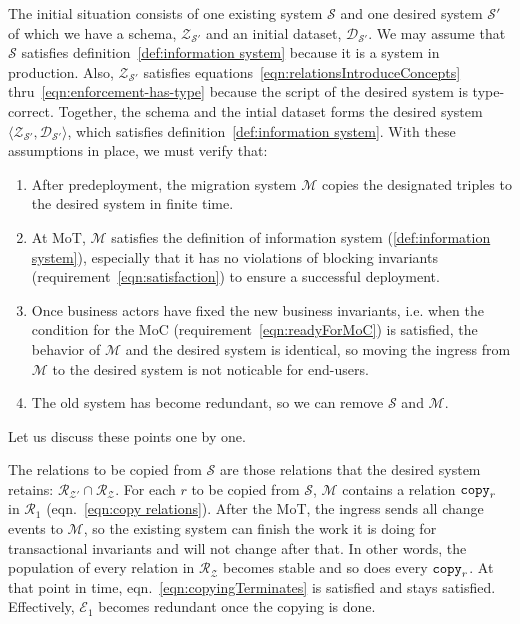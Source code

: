 \documentclass[runningheads]{llncs}
\newcommand{\pair}[2]{\langle{#1},{#2}\rangle}
\newcommand{\rels}{\mathcal{R}}   %
\newcommand{\transactions}{\mathcal{E}}
\newcommand{\dataset}{\mathscr{D}}
\newcommand{\schema}{\mathscr{Z}}
\newcommand{\migrsys}{\mathscr{M}}
\newcommand{\infsys}{\mathscr{S}}
\begin{document}
   The initial situation consists of one existing system $\infsys$ and one desired system $\infsys'$ of which we have a schema, $\schema_{\infsys'}$ and an initial dataset, $\dataset_{\infsys'}$.
   We may assume that $\infsys$ satisfies definition~\ref{def:information system} because it is a system in production.
   Also, $\schema_{\infsys'}$ satisfies equations~\ref{eqn:relationsIntroduceConcepts} thru~\ref{eqn:enforcement-has-type} because the script of the desired system is type-correct.
   Together, the schema and the intial dataset forms the desired system $\pair{\schema_{\infsys'}}{\dataset_{\infsys'}}$, which satisfies definition~\ref{def:information system}.
   With these assumptions in place,
   we must verify that:
\begin{enumerate}
\item After predeployment, the migration system $\migrsys$ copies the designated triples to the desired system in finite time.
\item At MoT, $\migrsys$ satisfies the definition of information system (\ref{def:information system}), especially that it has no violations of blocking invariants (requirement~\ref{eqn:satisfaction}) to ensure a successful deployment.
\item Once business actors have fixed the new business invariants, i.e. when the condition for the MoC (requirement~\ref{eqn:readyForMoC}) is satisfied,
   the behavior of $\migrsys$ and the desired system is identical, so moving the ingress from $\migrsys$ to the desired system is not noticable for end-users.
\item The old system has become redundant, so we can remove $\infsys$ and $\migrsys$.
\end{enumerate}
   Let us discuss these points one by one.

   The relations to be copied from $\infsys$ are those relations that the desired system retains: $\rels_{\schema'}\cap\rels_{\schema}$.
   For each $r$ to be copied from $\infsys$, $\migrsys$ contains a relation ${\tt copy}_r$ in $\rels_1$ (eqn.~\ref{eqn:copy relations}).
   After the MoT, the ingress sends all change events to $\migrsys$, so the existing system can finish the work it is doing for transactional invariants and will not change after that.
   In other words, the population of every relation in $\rels_{\schema}$ becomes stable and so does every ${\tt copy}_r$.
   At that point in time, eqn.~\ref{eqn:copyingTerminates} is satisfied and stays satisfied.
   Effectively, $\transactions_1$ becomes redundant once the copying is done.
\end{document}
